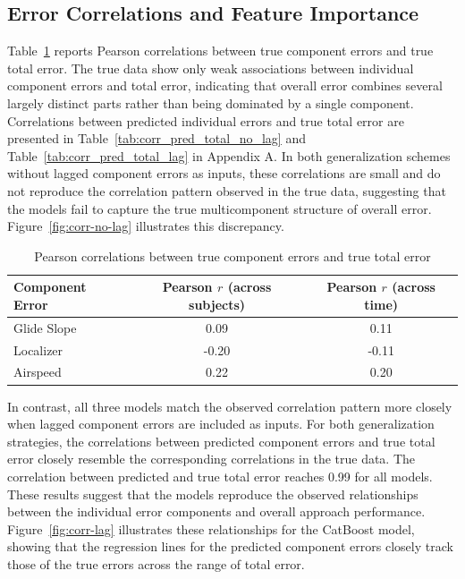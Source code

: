 \documentclass[11pt, a4paper]{article}
\begin{document}
\subsection{Error Correlations and Feature Importance}
Table~\ref{tab:corr-comp-total} reports Pearson correlations between true component errors and true total error. The true data show only weak associations between individual component errors and total error, indicating that overall error combines several largely distinct parts rather than being dominated by a single component. Correlations between predicted individual errors and true total error are presented in Table~\ref{tab:corr_pred_total_no_lag} and Table~\ref{tab:corr_pred_total_lag} in Appendix A. In both generalization schemes without lagged component errors as inputs, these correlations are small and do not reproduce the correlation pattern observed in the true data, suggesting that the models fail to capture the true multicomponent structure of overall error. Figure~\ref{fig:corr-no-lag} illustrates this discrepancy.

\begin{table}[htbp]
	\caption{Pearson correlations between true component errors and true total error}
	\label{tab:corr-comp-total}
	\centering
	\small
	\begin{tabular}{lcc}
		\toprule
		Component Error	& Pearson $r$ (across subjects)	& Pearson $r$ (across time)  \\ 
		\midrule
		Glide Slope  	& 0.09 & 0.11\\
		Localizer        & -0.20 & -0.11\\
		Airspeed  	& 0.22 & 0.20\\
		\bottomrule
	\end{tabular}
\end{table}

In contrast, all three models match the observed correlation pattern more closely when lagged component errors are included as inputs. For both generalization strategies, the correlations between predicted component errors and true total error closely resemble the corresponding correlations in the true data. The correlation between predicted and true total error reaches 0.99 for all models. These results suggest that the models reproduce the observed relationships between the individual error components and overall approach performance. Figure~\ref{fig:corr-lag} illustrates these relationships for the CatBoost model, showing that the regression lines for the predicted component errors closely track those of the true errors across the range of total error.
\end{document}
